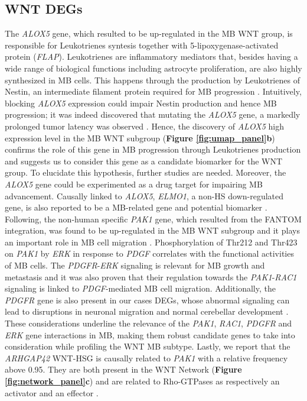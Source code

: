 \documentclass[10pt]{SelfArx} %
\begin{document}
\subsection{WNT DEGs}\label{sec:WNT_DE}
The \textit{ALOX5} gene, which resulted to be up-regulated in the MB WNT group, is responsible for Leukotrienes syntesis together with 5-lipoxygenase-activated protein (\textit{FLAP}). Leukotrienes are inflammatory mediators that, besides having a wide range of biological functions including astrocyte proliferation, are also highly synthesized in MB cells. This happens through the production by Leukotrienes of Nestin, an intermediate filament protein required for MB progression \cite{du2019leukotriene}. Intuitively, blocking \textit{ALOX5} expression could impair Nestin production and hence MB progression; it was indeed discovered that mutating the \textit{ALOX5} gene, a markedly prolonged tumor latency was observed \cite{du2019leukotriene}. Hence, the discovery of \textit{ALOX5} high expression level in the MB WNT subgroup (\textbf{Figure \ref{fig:umap_panel}b}) confirms the role of this gene in MB progression through Leukotrienes production and suggests us to consider this gene as a candidate biomarker for the WNT group. To elucidate this hypothesis, further studies are needed. Moreover, the \textit{ALOX5} gene could be experimented as a drug target for impairing MB advancement. Causally linked to \textit{ALOX5}, \textit{ELMO1}, a non-HS down-regulated gene, is also reported to be a MB-related gene and potential biomarker \cite{liu2020identification}. \\
Following, the non-human specific \textit{PAK1} gene, which resulted from the FANTOM \cite{fantom5} integration, was found to be up-regulated in the MB WNT subgroup and it plays an important role in MB cell migration \cite{yuan2010erk}. Phosphorylation of Thr212 and Thr423 on \textit{PAK1} by \textit{ERK} in response to \textit{PDGF} correlates with the functional activities of MB cells. The \textit{PDGFR}-\textit{ERK} signaling is relevant for MB growth and metastasis and it was also proven that their regulation towards the \textit{PAK1}-\textit{RAC1} signaling is linked to \textit{PDGF}-mediated MB cell migration. Additionally, the \textit{PDGFR} gene is also present in our cases DEGs, whose abnormal signaling can lead to disruptions in neuronal migration and normal cerebellar development \cite{andrae2004forced}\cite{macdonald2001expression}. These considerations underline the relevance of the \textit{PAK1}, \textit{RAC1}, \textit{PDGFR} and \textit{ERK} gene interactions in MB, making them robust candidate genes to take into consideration while profiling the WNT MB subtype. Lastly, we report that the \textit{ARHGAP42} WNT-HSG is causally related to \textit{PAK1} with a relative frequency above 0.95. They are both present in the WNT Network (\textbf{Figure \ref{fig:network_panel}c}) and are related to Rho-GTPases as respectively an activator and an effector \cite{manser1994brain}.\\
\end{document}
